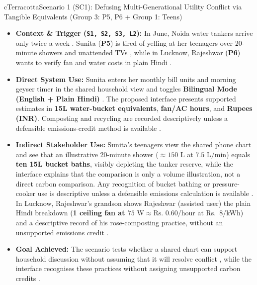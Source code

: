 \documentclass[12pt, a4paper]{article}
\begin{document}
\begin{scenariocard}{cTerracotta}{Scenario 1 (SC1): Defusing Multi-Generational Utility Conflict via Tangible Equivalents (Group 3: P5, P6 + Group 1: Teens)}
\footnotesize
\begin{itemize}
    \item \textbf{Context \& Trigger (\texttt{S1, S2, S3, L2}):} In June, Noida water tankers arrive only twice a week \cite{cf3}. Sunita (\textbf{P5}) is tired of yelling at her teenagers over 20-minute showers and unattended TVs \cite{cf3}, while in Lucknow, Rajeshwar (\textbf{P6}) wants to verify fan and water costs in plain Hindi \cite{cf8}.
    \item \textbf{Direct System Use:} Sunita enters her monthly bill units and morning geyser timer in the shared household view and toggles \textbf{Bilingual Mode (English + Plain Hindi)} \cite{cf3}. The proposed interface presents supported estimates in \textbf{15L water-bucket equivalents}, \textbf{fan/AC hours}, and \textbf{Rupees (INR)}. Composting and recycling are recorded descriptively unless a defensible emissions-credit method is available \cite{cf3, cf8}.
    \item \textbf{Indirect Stakeholder Use:} Sunita's teenagers view the shared phone chart and see that an illustrative 20-minute shower ($\approx 150\text{ L}$ at $7.5\text{ L/min}$) equals \textbf{ten 15L bucket baths}, visibly depleting the tanker reserve, while the interface explains that the comparison is only a volume illustration, not a direct carbon comparison. Any recognition of bucket bathing or pressure-cooker use is descriptive unless a defensible emissions calculation is available \cite{cf3}. In Lucknow, Rajeshwar's grandson shows Rajeshwar (assisted user) the plain Hindi breakdown (\textbf{1 ceiling fan at $75\text{ W} \approx \text{Rs.\ } 0.60/\text{hour}$} at Rs.\ 8/kWh) and a descriptive record of his rose-composting practice, without an unsupported emissions credit \cite{cf8}.
    \item \textbf{Goal Achieved:} The scenario tests whether a shared chart can support household discussion without assuming that it will resolve conflict \cite{cf3}, while the interface recognises these practices without assigning unsupported carbon credits \cite{cf8}.
\end{itemize}
\end{scenariocard}
\end{document}
